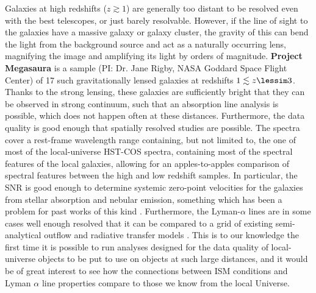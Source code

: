 \documentclass[12pt, a4paper]{scrartcl}
\begin{document}
Galaxies at high redshifts ($z \gtrsim 1$) are generally too distant to be
resolved even with the best telescopes, or just barely resolvable. However, if
the line of sight to the galaxies have a massive galaxy or galaxy cluster, the
gravity of this can bend the light from the background source and act as a
naturally occurring lens, magnifying the image and amplifying its light by
orders of magnitude. \textbf{Project Megasaura} is a sample (PI: Dr. Jane Rigby,
NASA Goddard Space Flight Center) of 17 such gravitationally lensed galaxies at
redshifts $1 \lesssim z \lessim 3$. Thanks to the strong lensing, these galaxies
are sufficiently bright that they can be observed in strong continuum, such that
an absorption line analysis is possible, which does not happen often at these
distances. Furthermore, the data quality is good enough that spatially resolved
studies are possible. The spectra cover a rest-frame wavelength range
containing, but not limited to, the one of most of the local-universe HST-COS
spectra, containing most of the spectral features of the local galaxies,
allowing for an apples-to-apples comparison of spectral features between the
high and low redshift samples. In particular, the SNR is good enough to
determine systemic zero-point velocities for the galaxies from stellar
absorption and nebular emission, something which has been a problem for past
works of this kind \citep[e.g.][]{Jones2013}. Furthermore, the Lyman-$\alpha$
lines are in some cases well enough resolved that it can be compared to a grid
of existing semi-analytical outflow and radiative transfer models
\citep{Schaerer2011}. This is to our knowledge the first time it is possible to
run analyses designed for the data quality of local-universe objects to be put
to use on objects at such large distances, and it would be of great interest to
see how the connections between ISM conditions and Lyman $\alpha$ line
properties compare to those we know from the local Universe.
\end{document}
